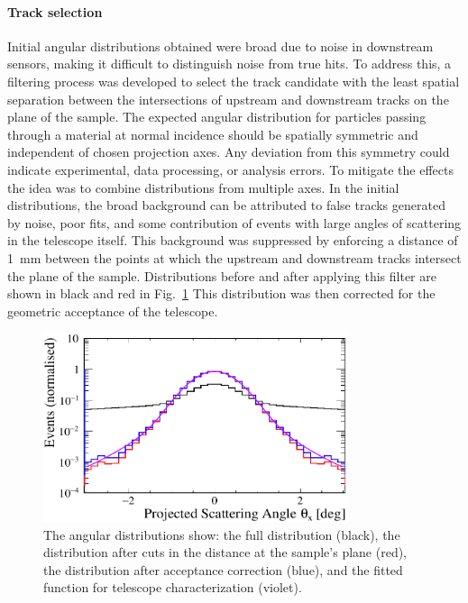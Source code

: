 \begin{refsection}
        \paragraph{Track selection}
        Initial angular distributions obtained were broad due to noise in downstream sensors, making it difficult to distinguish noise from true hits. 
        To address this, a filtering process was developed to select the track candidate with the least spatial separation between the intersections of upstream and downstream tracks on the plane of the sample.
        The expected angular distribution for particles passing through a material at normal incidence should be spatially symmetric and independent of chosen projection axes. 
        Any deviation from this symmetry could indicate experimental, data processing, or analysis errors. 
        To mitigate the effects the idea was to combine distributions from multiple axes.
        In the initial distributions, the broad background can be attributed to false tracks generated by noise, poor fits, and some contribution of events with large angles of scattering in the telescope itself. 
        This background was suppressed by enforcing a distance of \SI{1}{mm} between the points at which the upstream and downstream tracks intersect the plane of the sample.        
        Distributions before and after applying this filter are shown in black and red in Fig.~\ref{fig:muEDM:bt2021:distributions}
        This distribution was then corrected for the geometric acceptance of the telescope.
        \begin{figure}
            \centering
            \includegraphics[width=0.8\textwidth]{Figures/muEDM_Dec2021/distributions.png}
            \caption{The angular distributions show: the full distribution (black), the distribution after cuts in the distance at the sample's plane (red), the distribution after acceptance correction (blue), and the fitted function for telescope characterization (violet).}
            \label{fig:muEDM:bt2021:distributions}
        \end{figure}
        

\end{refsection}
